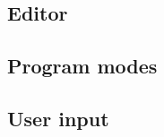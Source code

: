 \subsection{Editor}
\label{subsec:editor}


\subsection{Program modes}
\label{subsec:program-modes}


\subsection{User input}
\label{subsec:user-input}

